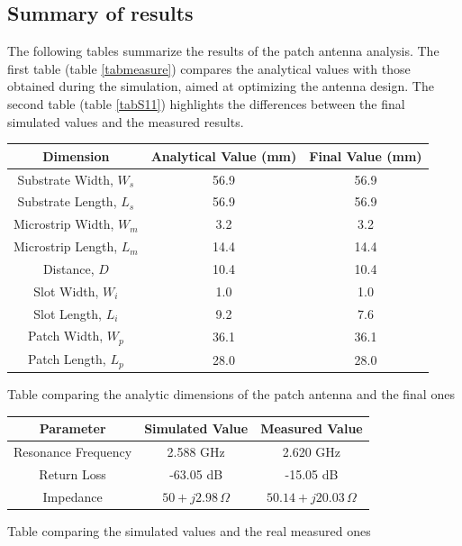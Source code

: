 \documentclass[]{article}
\begin{document}
\subsection{Summary of results}
The following tables summarize the results of the patch antenna analysis. The first table (table \eqref{tabmeasure}) compares the analytical values with those obtained during the simulation, aimed at optimizing the antenna design. The second table (table \eqref{tabS11}) highlights the differences between the final simulated values and the measured results.
\begin{center}
	 \captionsetup{type=table} %
	\begin{tabular}{|c|c|c|}
		\hline
		\textbf{Dimension} & \textbf{Analytical Value (mm)} & \textbf{Final Value (mm)} \\
		\hline
		Substrate Width, $W_s$ & 56.9 & 56.9\\
		\hline
		Substrate Length, $L_s$ & 56.9 & 56.9\\
		\hline
		Microstrip Width, $W_m$ & 3.2 & 3.2\\
		\hline
		Microstrip Length, $L_m$ & 14.4& 14.4\\
		\hline
		Distance, $D$ & 10.4 & 10.4\\
		\hline
		Slot Width, $W_i$ & 1.0 & 1.0\\
		\hline
		Slot Length, $L_i$ & 9.2 & 7.6\\
		\hline
		Patch Width, $W_p$ & 36.1 & 36.1\\
		\hline
		Patch Length, $L_p$ & 28.0 & 28.0\\
		\hline
	\end{tabular}
	\caption{Table comparing the analytic dimensions of the patch antenna and the final ones}
	\label{tabmeasure}
\end{center}
\begin{center}
	\captionsetup{type=table} %
	\begin{tabular}{|c|c|c|}
		\hline
		\textbf{Parameter} & \textbf{Simulated Value} & \textbf{Measured Value} \\
		\hline
		Resonance Frequency & 2.588 GHz & 2.620 GHz\\
		\hline
		Return Loss & -63.05 dB & -15.05 dB\\
		\hline
		Impedance & $50 + j2.98 \, \Omega$ & $50.14 + j20.03 \, \Omega$\\
			\hline
	\end{tabular}
	\caption{Table comparing the simulated values and the real measured ones}
	\label{tabS11}
\end{center}
\end{document}
